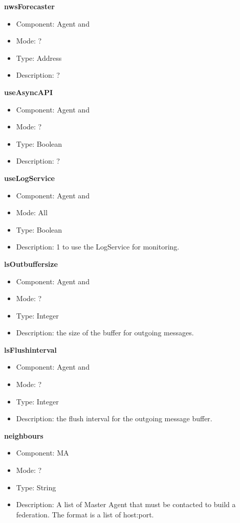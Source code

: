 \begin{description}
\item{\bf{nwsForecaster}}
  \begin{itemize}
  \item Component: Agent and \sed
  \item Mode: ?
  \item Type: Address
  \item Description: ?
  \end{itemize}

\item{\bf{useAsyncAPI}}
  \begin{itemize}
  \item Component: Agent and \sed
  \item Mode: ?
  \item Type: Boolean
  \item Description: ?
  \end{itemize}

\item{\bf{useLogService}}
  \begin{itemize}
  \item Component: Agent and \sed
  \item Mode: All
  \item Type: Boolean
  \item Description: 1 to use the LogService for monitoring.
  \end{itemize}

\item{\bf{lsOutbuffersize}}
  \begin{itemize}
  \item Component: Agent and \sed
  \item Mode: ?
  \item Type: Integer
  \item Description: the size of the buffer for outgoing messages.
  \end{itemize}

\item{\bf{lsFlushinterval}}
  \begin{itemize}
  \item Component: Agent and \sed
  \item Mode: ?
  \item Type: Integer
  \item Description: the flush interval for the outgoing message buffer.
  \end{itemize}

\item{\bf{neighbours}}
  \begin{itemize}
  \item Component: MA
  \item Mode: ?
  \item Type: String
  \item Description: A list of Master Agent that must be contacted to
    build a federation. The format is a list of host:port.
  \end{itemize}


\end{description}

